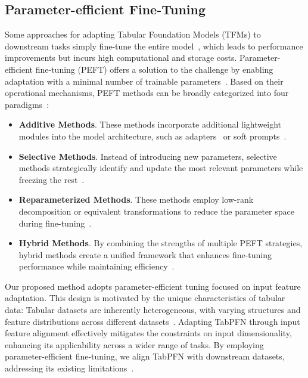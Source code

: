 \subsection{Parameter-efficient Fine-Tuning} 
Some approaches for adapting Tabular Foundation Models (TFMs) to downstream tasks simply fine-tune the entire model~\cite{LocalPFN,TabForestPFN}, which leads to performance improvements but incurs high computational and storage costs. Parameter-efficient fine-tuning (PEFT) offers a solution to the challenge by enabling adaptation with a minimal number of trainable parameters~\cite{Guide_PEFT}. 
Based on their operational mechanisms, PEFT methods can be broadly categorized into four paradigms~\cite{PEFT_Survey}:
\begin{itemize}[noitemsep,topsep=0pt,leftmargin=*]
\item \textbf{Additive Methods}. These methods incorporate additional lightweight modules into the model architecture, such as adapters~\cite{Serial_Adapter,SideTuning,MixturePFN} or soft prompts~\cite{Prefix_Tuning,TuneTables}. 
\item \textbf{Selective Methods}. Instead of introducing new parameters, selective methods strategically identify and update the most relevant parameters while freezing the rest~\cite{FuYSLBC23SAM,He0ZTZ23SPT}.%
\item \textbf{Reparameterized Methods}. These methods employ low-rank decomposition or equivalent transformations to reduce the parameter space during fine-tuning~\cite{AghajanyanGZ20SAID,HuSWALWWC22LoRA,ValipourRKG23DyLoRA}. 
\item \textbf{Hybrid Methods}. By combining the strengths of multiple PEFT strategies, hybrid methods create a unified framework that enhances fine-tuning performance while maintaining efficiency~\cite{MaoMHAM0YK22UniPELT,ChenZS0SY23S4}.
\end{itemize}

Our proposed method adopts parameter-efficient tuning focused on input feature adaptation. This design is motivated by the unique characteristics of tabular data: Tabular datasets are inherently heterogeneous, with varying structures and feature distributions across different datasets~\cite{Zhou2023TabToken,TabPTM,BorisovLSHPK24TabularSurvey}. Adapting TabPFN through input feature alignment effectively mitigates the constraints on input dimensionality, enhancing its applicability across a wider range of tasks.  By employing parameter-efficient fine-tuning, we align TabPFN with downstream datasets, addressing its existing limitations~\cite{Hollmann2022TabPFN}. %

